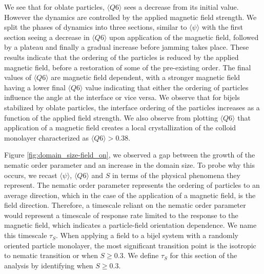 We see that for oblate particles, \(\langle Q6 \rangle\) sees a
decrease from its initial value. However the dynamics are controlled by
the applied magnetic field strength. We split the phases of dynamics
into three sections, similar to \(\langle \psi \rangle\) with the first
section seeing a decrease in \(\langle Q6 \rangle\) upon application of
the magnetic field, followed by a plateau and finally a gradual increase
before jamming takes place. These results indicate that the ordering of
the particles is reduced by the applied magnetic field, before a
restoration of some of the pre-existing order. The final values of
\(\langle Q6 \rangle\) are magnetic field dependent, with a stronger
magnetic field having a lower final \(\langle Q6 \rangle\) value
indicating that either the ordering of particles influence the angle at
the interface or vice versa. We observe that for bijels stabilized by
oblate particles, the interface ordering of the particles increases as a
function of the applied field strength. We also observe from plotting
\(\langle Q6 \rangle\) that application of a magnetic field creates a
local crystallization of the colloid monolayer characterized as
\(\langle Q6 \rangle > 0.38\). \cite{toxvaerd_role_2020}

Figure \ref{fig:domain_size-field_on}, we observed a gap between the
growth of the nematic order parameter and an increase in the domain
size. To probe why this occurs, we recast \(\langle \psi \rangle\),
\(\langle Q6 \rangle\) and \(S\) in terms of the physical phenomena
they represent. The nematic order parameter represents the ordering of
particles to an average direction, which in the case of the application
of a magnetic field, is the field direction. Therefore, a timescale
reliant on the nematic order parameter would represent a timescale of
response rate limited to the response to the magnetic field, which
indicates a particle-field orientation dependence. We name this
timescale \(\tau_S\). When applying a field to a bijel system with a
randomly oriented particle monolayer, the most significant transition
point is the isotropic to nematic transition or when \(S \geq 0.3\). We
define \(\tau_S\) for this section of the analysis by identifying when
\(S \geq 0.3\).

